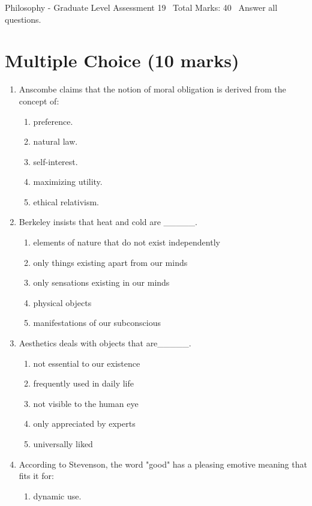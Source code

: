 \documentclass[12pt]{article}
\begin{document}
\begin{center}
Philosophy - Graduate Level Assessment 19 \
Total Marks: 40 \
Answer all questions.
\end{center}

\section*{Multiple Choice (10 marks)}
\begin{enumerate}[label=\arabic*.]
\item Anscombe claims that the notion of moral obligation is derived from the concept of:
\begin{enumerate}[label=(\alph*)]
    \item preference.
    \item natural law.
    \item self-interest.
    \item maximizing utility.
    \item ethical relativism.
\end{enumerate}
\item Berkeley insists that heat and cold are \_\_\_\_\_.
\begin{enumerate}[label=(\alph*)]
    \item elements of nature that do not exist independently
    \item only things existing apart from our minds
    \item only sensations existing in our minds
    \item physical objects
    \item manifestations of our subconscious
\end{enumerate}
\item Aesthetics deals with objects that are\_\_\_\_\_.
\begin{enumerate}[label=(\alph*)]
    \item not essential to our existence
    \item frequently used in daily life
    \item not visible to the human eye
    \item only appreciated by experts
    \item universally liked
\end{enumerate}
\item According to Stevenson, the word "good" has a pleasing emotive meaning that fits it for:
\begin{enumerate}[label=(\alph*)]
    \item dynamic use.

\end{enumerate}
\end{enumerate}
\end{document}
